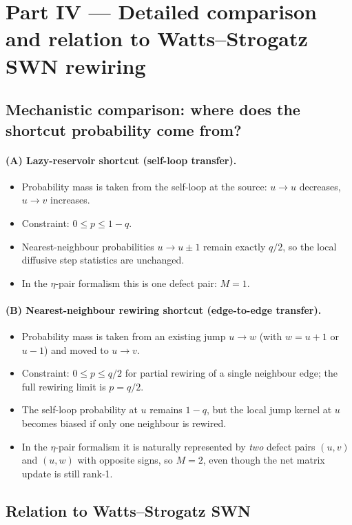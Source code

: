 \documentclass[11pt]{article}
\begin{document}
\section{Part IV --- Detailed comparison and relation to Watts--Strogatz SWN rewiring}

\subsection{Mechanistic comparison: where does the shortcut probability come from?}

\paragraph{(A) Lazy-reservoir shortcut (self-loop transfer).}
\begin{itemize}
\item Probability mass is taken from the self-loop at the source: $u\to u$ decreases, $u\to v$ increases.
\item Constraint: $0\le p\le 1-q$.
\item Nearest-neighbour probabilities $u\to u\pm1$ remain exactly $q/2$, so the local diffusive step statistics are unchanged.
\item In the $\eta$-pair formalism this is one defect pair: $M=1$.
\end{itemize}

\paragraph{(B) Nearest-neighbour rewiring shortcut (edge-to-edge transfer).}
\begin{itemize}
\item Probability mass is taken from an existing jump $u\to w$ (with $w=u+1$ or $u-1$) and moved to $u\to v$.
\item Constraint: $0\le p\le q/2$ for partial rewiring of a single neighbour edge; the full rewiring limit is $p=q/2$.
\item The self-loop probability at $u$ remains $1-q$, but the local jump kernel at $u$ becomes biased if only one neighbour is rewired.
\item In the $\eta$-pair formalism it is naturally represented by \emph{two} defect pairs $(u,v)$ and $(u,w)$ with opposite signs, so $M=2$,
even though the net matrix update is still rank-1.
\end{itemize}

\subsection{Relation to Watts--Strogatz SWN}
\end{document}

